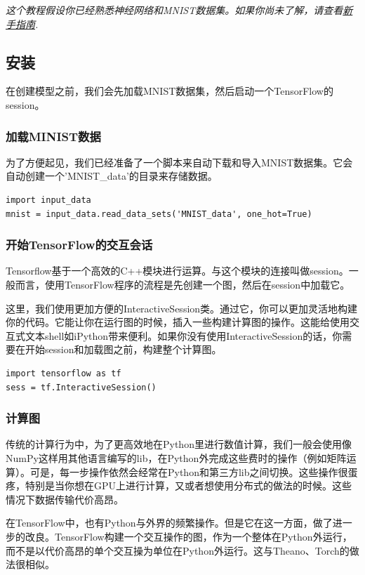 \documentclass[a4paper,11pt,twoside]{ctexbook}
\begin{document}
\emph{这个教程假设你已经熟悉神经网络和MNIST数据集。如果你尚未了解，请查看\hyperref[MINIST_beginner]{新手指南}.}

\subsection {安装}
在创建模型之前，我们会先加载MNIST数据集，然后启动一个TensorFlow的session。

\subsubsection {加载MINIST数据}

为了方便起见，我们已经准备了一个脚本来自动下载和导入MNIST数据集。它会自动创建一个'MNIST\_data'的目录来存储数据。

\begin{lstlisting}
import input_data
mnist = input_data.read_data_sets('MNIST_data', one_hot=True)
\end{lstlisting}

\subsubsection {开始TensorFlow的交互会话}

Tensorflow基于一个高效的C++模块进行运算。与这个模块的连接叫做session。一般而言，使用TensorFlow程序的流程是先创建一个图，然后在session中加载它。

这里，我们使用更加方便的InteractiveSession类。通过它，你可以更加灵活地构建你的代码。它能让你在运行图的时候，插入一些构建计算图的操作。这能给使用交互式文本shell如iPython带来便利。如果你没有使用InteractiveSession的话，你需要在开始session和加载图之前，构建整个计算图。

\begin{lstlisting}
import tensorflow as tf
sess = tf.InteractiveSession()
\end{lstlisting}

\subsubsection {计算图}

传统的计算行为中，为了更高效地在Python里进行数值计算，我们一般会使用像NumPy这样用其他语言编写的lib，在Python外完成这些费时的操作（例如矩阵运算）。可是，每一步操作依然会经常在Python和第三方lib之间切换。这些操作很蛋疼，特别是当你想在GPU上进行计算，又或者想使用分布式的做法的时候。这些情况下数据传输代价高昂。

在TensorFlow中，也有Python与外界的频繁操作。但是它在这一方面，做了进一步的改良。TensorFlow构建一个交互操作的图，作为一个整体在Python外运行，而不是以代价高昂的单个交互操为单位在Python外运行。这与Theano、Torch的做法很相似。
\end{document}

